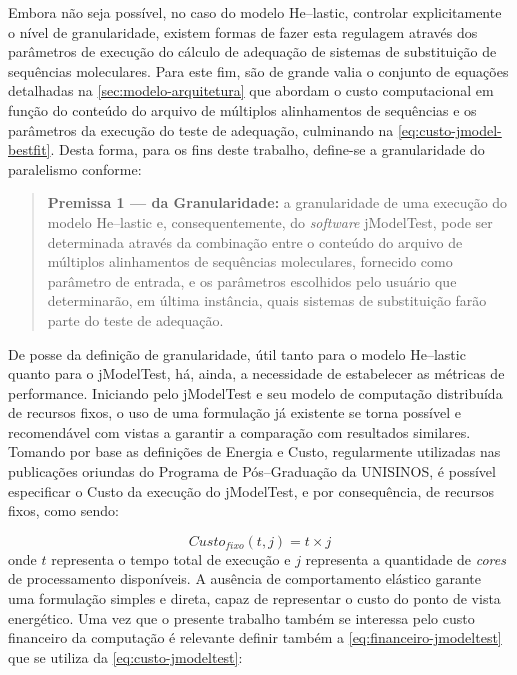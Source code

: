 \documentclass[english,brazilian]{UNISINOSmonografia} %
\begin{document}
Embora não seja possível, no caso do modelo \textsf{He}--lastic, controlar explicitamente o nível de granularidade, existem formas de fazer esta regulagem através dos parâmetros de execução do cálculo de adequação de sistemas de substituição de sequências moleculares.
Para este fim, são de grande valia o conjunto de equações detalhadas na \autoref{sec:modelo-arquitetura} que abordam o custo computacional em função do conteúdo do arquivo de múltiplos alinhamentos de sequências e os parâmetros da execução do teste de adequação, culminando na \autoref{eq:custo-jmodel-bestfit}.
Desta forma, para os fins deste trabalho, define-se a granularidade do paralelismo conforme:
\begin{quote}
	\textbf{Premissa 1 --- da Granularidade:} a granularidade de uma execução do modelo \textsf{He}--lastic e, consequentemente, do \textit{software} jModelTest, pode ser determinada através da combinação entre o conteúdo do arquivo de múltiplos alinhamentos de sequências moleculares, fornecido como parâmetro de entrada, e os parâmetros escolhidos pelo usuário que determinarão, em última instância, quais sistemas de substituição farão parte do teste de adequação.
\end{quote}



De posse da definição de granularidade, útil tanto para o modelo \textsf{He}--lastic quanto para o jModelTest, há, ainda, a necessidade de estabelecer as métricas de performance.
Iniciando pelo jModelTest e seu modelo de computação distribuída de recursos fixos, o uso de uma formulação já existente se torna possível e recomendável com vistas a garantir a comparação com resultados similares.
Tomando por base as definições de Energia e Custo, regularmente utilizadas nas publicações oriundas do Programa de Pós--Graduação da UNISINOS, é possível especificar o Custo da execução do jModelTest, e por consequência, de recursos fixos, como sendo:

\begin{equation}
\label{eq:custo-jmodeltest}
Custo_{fixo}(t,j) = t \times j
\end{equation}
onde $ t $ representa o tempo total de execução e $ j $ representa a quantidade de \textit{cores} de processamento disponíveis.
A ausência de comportamento elástico garante uma formulação simples e direta, capaz de representar o custo do ponto de vista energético.
Uma vez que o presente trabalho também se interessa pelo custo financeiro da computação é relevante definir também a \autoref{eq:financeiro-jmodeltest} que se utiliza da \autoref{eq:custo-jmodeltest}:
\end{document}
